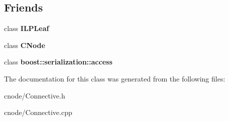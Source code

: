 \subsection*{\-Friends}
\begin{DoxyCompactItemize}
\item 
\hypertarget{classConnective_a552ea17ad95fff16941105e4aefb0752}{class {\bfseries \-I\-L\-P\-Leaf}}\label{classConnective_a552ea17ad95fff16941105e4aefb0752}

\item 
\hypertarget{classConnective_a0657a422d4ddc5f4a0ff56931b7d2767}{class {\bfseries \-C\-Node}}\label{classConnective_a0657a422d4ddc5f4a0ff56931b7d2767}

\item 
\hypertarget{classConnective_ac98d07dd8f7b70e16ccb9a01abf56b9c}{class {\bfseries boost\-::serialization\-::access}}\label{classConnective_ac98d07dd8f7b70e16ccb9a01abf56b9c}

\end{DoxyCompactItemize}


\-The documentation for this class was generated from the following files\-:\begin{DoxyCompactItemize}
\item 
cnode/\-Connective.\-h\item 
cnode/\-Connective.\-cpp\end{DoxyCompactItemize}
